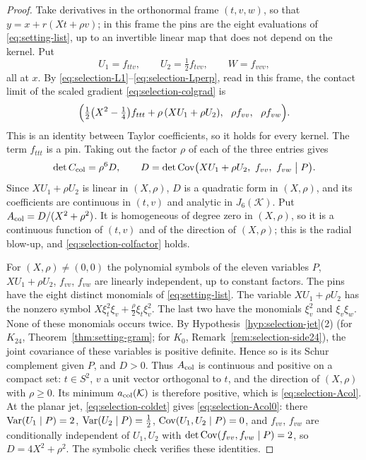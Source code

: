\begin{proof}
Take derivatives in the orthonormal frame $(t,v,w)$, so that $y=x+r(Xt+\rho v)$; in this frame the pins are the eight evaluations of \eqref{eq:setting-list}, up to an invertible linear map that does not depend on the kernel. Put
\[
U_1=f_{ttv},\qquad U_2=\tfrac12f_{tvv},\qquad W=f_{vvv},
\]
all at $x$. By \eqref{eq:selection-L1}--\eqref{eq:selection-Lperp}, read in this frame, the contact limit of the scaled gradient \eqref{eq:selection-colgrad} is
\[
\Bigl(\tfrac12\bigl(X^2-\tfrac14\bigr)f_{ttt}+\rho\,(XU_1+\rho U_2),\ \ \rho f_{vv},\ \ \rho f_{vw}\Bigr).
\]
This is an identity between Taylor coefficients, so it holds for every kernel. The term $f_{ttt}$ is a pin. Taking out the factor $\rho$ of each of the three entries gives
\[
\det C_{\rm col}=\rho^6D,\qquad D=\det\Cov\bigl(XU_1+\rho U_2,\ f_{vv},\ f_{vw}\bigm|P\bigr).
\]
Since $XU_1+\rho U_2$ is linear in $(X,\rho)$, $D$ is a quadratic form in $(X,\rho)$, and its coefficients are continuous in $(t,v)$ and analytic in $J_6(\mathcal K)$. Put $A_{\rm col}=D/(X^2+\rho^2)$. It is homogeneous of degree zero in $(X,\rho)$, so it is a continuous function of $(t,v)$ and of the direction of $(X,\rho)$; this is the radial blow-up, and \eqref{eq:selection-colfactor} holds.

For $(X,\rho)\ne(0,0)$ the polynomial symbols of the eleven variables $P$, $XU_1+\rho U_2$, $f_{vv}$, $f_{vw}$ are linearly independent, up to constant factors. The pins have the eight distinct monomials of \eqref{eq:setting-list}. The variable $XU_1+\rho U_2$ has the nonzero symbol $X\xi_t^2\xi_v+\frac\rho2\xi_t\xi_v^2$. The last two have the monomials $\xi_v^2$ and $\xi_v\xi_w$. None of these monomials occurs twice. By Hypothesis~\ref{hyp:selection-jet}(2) (for $K_{24}$, Theorem~\ref{thm:setting-gram}; for $K_0$, Remark~\ref{rem:selection-side24}), the joint covariance of these variables is positive definite. Hence so is its Schur complement given $P$, and $D>0$. Thus $A_{\rm col}$ is continuous and positive on a compact set: $t\in S^2$, $v$ a unit vector orthogonal to $t$, and the direction of $(X,\rho)$ with $\rho\ge0$. Its minimum $a_{\rm col}(\mathcal K)$ is therefore positive, which is \eqref{eq:selection-Acol}. At the planar jet, \eqref{eq:selection-coldet} gives \eqref{eq:selection-Acol0}: there $\operatorname{Var}(U_1\mid P)=2$, $\operatorname{Var}(U_2\mid P)=\frac12$, $\operatorname{Cov}(U_1,U_2\mid P)=0$, and $f_{vv}$, $f_{vw}$ are conditionally independent of $U_1,U_2$ with $\det\operatorname{Cov}(f_{vv},f_{vw}\mid P)=2$, so $D=4X^2+\rho^2$. The symbolic check  verifies these identities.
\end{proof}

